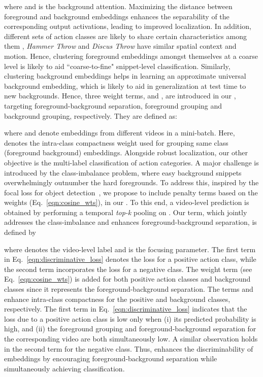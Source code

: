 \documentclass[10pt,twocolumn,letterpaper]{article}
\begin{document}
where  and  is the background attention.
Maximizing the distance between foreground and background embeddings enhances the separability of the corresponding output activations, leading to improved localization.
In addition, different sets of action classes are likely to share certain characteristics among them \eg, \textit{Hammer Throw} and \textit{Discus Throw} have similar spatial context and motion. Hence, clustering foreground embeddings amongst themselves at a coarse level is likely to aid ``coarse-to-fine" snippet-level classification.
Similarly, clustering background embeddings helps in learning an approximate universal background embedding, which is likely to aid in generalization at test time to new backgrounds.
Hence, three weight terms,  and , are introduced in our , targeting foreground-background separation, foreground grouping and background grouping, respectively. They are defined as: 

where  and  denote embeddings from different videos in a mini-batch. Here,  denotes the intra-class compactness weight used for grouping same class (foreground \vs background) embeddings.
Alongside robust localization, our other objective is the multi-label classification of action categories. 
A major challenge is introduced by the class-imbalance problem, where easy background snippets overwhelmingly outnumber the hard foregrounds. 
To address this, inspired by the focal loss for object detection~\cite{focal_loss}, we propose to include penalty terms based on the weights (Eq.~\ref{eqn:cosine_wts}), in our .
To this end, a video-level prediction  is obtained by performing a temporal \emph{top-k} pooling on . Our  term, which jointly addresses the class-imbalance and enhances foreground-background separation, is defined by

where  denotes the video-level label and  is the focusing parameter. The first term in Eq.~\ref{eqn:discriminative_loss} denotes the loss for a positive action class, while the second term incorporates the loss for a negative class. The weight term  (see Eq.~\ref{eqn:cosine_wts}) is added for both positive action classes and background classes since it represents the foreground-background separation. 
The terms  and  enhance intra-class compactness for the positive and background classes, respectively. 
The first term in Eq.~\ref{eqn:discriminative_loss} indicates that the loss due to a positive action class  is low only when (i) its predicted probability  is high, and (ii) the foreground grouping  and foreground-background separation  for the corresponding video are both simultaneously low. A similar observation holds in the second term for the negative class. Thus,  enhances the discriminability of embeddings  by encouraging foreground-background separation while simultaneously achieving classification. 
\end{document}
